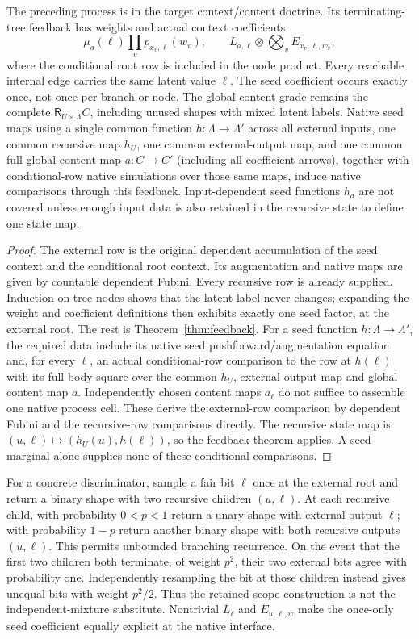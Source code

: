 \documentclass[11pt]{article}
\newcommand{\R}{\mathsf R}\newcommand{\Col}{\mathsf{Col}}\newcommand{\Vect}{\mathbf{Vect}_k}
\begin{document}
\begin{proposition}
The preceding process is in the target context/content doctrine. Its terminating-tree feedback has weights and actual context coefficients
\[
 \mu_a(\ell)\prod_{v}p_{x_v,\ell}(w_v),
 \qquad
 L_{a,\ell}\otimes\bigotimes_v E_{x_v,\ell,w_v},
\]
where the conditional root row is included in the node product. Every reachable internal edge carries the same latent value $\ell$. The seed coefficient occurs exactly once, not once per branch or node. The global content grade remains the complete $\R_{U\times\Lambda} C$, including unused shapes with mixed latent labels. Native seed maps using a single common function $h:\Lambda\to\Lambda'$ across all external inputs, one common recursive map $h_U$, one common external-output map, and one common full global content map $a:C\to C'$ (including all coefficient arrows), together with conditional-row native simulations over those same maps, induce native comparisons through this feedback. Input-dependent seed functions $h_a$ are not covered unless enough input data is also retained in the recursive state to define one state map.
\end{proposition}
\begin{proof}
The external row is the original dependent accumulation of the seed context and the conditional root context. Its augmentation and native maps are given by countable dependent Fubini. Every recursive row is already supplied. Induction on tree nodes shows that the latent label never changes; expanding the weight and coefficient definitions then exhibits exactly one seed factor, at the external root. The rest is Theorem~\ref{thm:feedback}. For a seed function $h:\Lambda\to\Lambda'$, the required data include its native seed pushforward/augmentation equation and, for every $\ell$, an actual conditional-row comparison to the row at $h(\ell)$ with its full body square over the common $h_U$, external-output map and global content map $a$. Independently chosen content maps $a_\ell$ do not suffice to assemble one native process cell. These derive the external-row comparison by dependent Fubini and the recursive-row comparisons directly. The recursive state map is $(u,\ell)\mapsto(h_U(u),h(\ell))$, so the feedback theorem applies. A seed marginal alone supplies none of these conditional comparisons.
\end{proof}

For a concrete discriminator, sample a fair bit $\ell$ once at the external root and return a binary shape with two recursive children $(u,\ell)$. At each recursive child, with probability $0<p<1$ return a unary shape with external output $\ell$; with probability $1-p$ return another binary shape with both recursive outputs $(u,\ell)$. This permits unbounded branching recurrence. On the event that the first two children both terminate, of weight $p^2$, their two external bits agree with probability one. Independently resampling the bit at those children instead gives unequal bits with weight $p^2/2$. Thus the retained-scope construction is not the independent-mixture substitute. Nontrivial $L_\ell$ and $E_{u,\ell,w}$ make the once-only seed coefficient equally explicit at the native interface.
\end{document}

